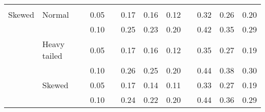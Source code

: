 \begin{table}[ht]
\begin{scriptsize}
\begin{tabular}{ll p{.1cm} c p{.1cm} rrr p{.1cm} rrr}
             &&&&&&&&&&&\\
Skewed       & Normal       && 0.05 &&  0.17 & 0.16 & 0.12 && 0.32 & 0.26 & 0.20 \\ 
             &              && 0.10 &&  0.25 & 0.23 & 0.20 && 0.42 & 0.35 & 0.29 \\ 
             & Heavy tailed && 0.05 &&  0.17 & 0.16 & 0.12 && 0.35 & 0.27 & 0.19 \\ 
             &              && 0.10 &&  0.26 & 0.25 & 0.20 && 0.44 & 0.38 & 0.30 \\ 
             & Skewed       && 0.05 &&  0.17 & 0.14 & 0.11 && 0.33 & 0.27 & 0.19 \\ 
             &              && 0.10 &&  0.24 & 0.22 & 0.20 && 0.44 & 0.36 & 0.29 \\ 

\hline
\end{tabular}
\end{scriptsize}
\end{table}

